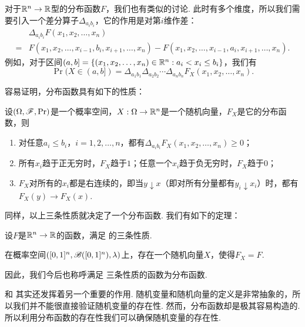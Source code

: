 对于$\mathbb{R}^n\to\mathbb{R}$型的分布函数$F$，我们也有类似的讨论. 此时有多个维度，所以我们需要引入一个差分算子$\Delta_{a_ib_i}$，它的作用是对第$i$维作差：
\begin{align*}
    &\Delta_{a_ib_i}F(x_1,x_2,\ldots,x_n) \\
    = &F(x_1,x_2,\ldots,x_{i-1},b_i,x_{i+1},\ldots,x_n)-F(x_1,x_2,\ldots,x_{i-1},a_i,x_{i+1},\ldots,x_n).
\end{align*}
例如，对于区间$(a,b]=\{(x_1,x_2,\ldots,x_n)\in\mathbb{R}^n:a_i<x_i\leq b_i\}$，我们有
\[
    \Pr(X\in(a,b]) = \Delta_{a_1b_1}\Delta_{a_2b_2}\cdots\Delta_{a_nb_n}F_X(x_1,x_2,\ldots,x_n).
\]

容易证明，分布函数具有如下的性质：

\begin{proposition}\label{prop:distribution-function-n}
设$(\Omega,\mathscr{F},\Pr)$是一个概率空间，$X:\Omega\to\mathbb{R}^n$是一个随机向量，$F_X$是它的分布函数，则
\begin{enumerate}
    \item 对任意$a_i\leq b_i$，$i=1,2,\ldots,n$，都有$\Delta_{a_ib_i}F_X(x_1,x_2,\ldots,x_n)\geq 0$；
    \item 所有$x_i$趋于正无穷时，$F_X$趋于$1$；任意一个$x_i$趋于负无穷时，$F_X$趋于$0$；
    \item $F_X$对所有的$x_i$都是右连续的，即当$y\downarrow x$（即对所有分量都有$y_i\downarrow x_i$）时，都有$F_X(y)\to F_X(x)$.
\end{enumerate}
\end{proposition}

同样，以上三条性质就决定了一个分布函数. 我们有如下的定理：

\begin{theorem}\label{thm:distribution-function-n}
设$F$是$\mathbb{R}^n\to\mathbb{R}$的函数，满足 的三条性质.

在概率空间$([0,1]^n,\mathscr{B}([0,1]^n),\lambda)$上，存在一个随机向量$X$，使得$F_X=F$.
\end{theorem}

因此，我们今后也称呼满足 三条性质的函数为分布函数. 

\begin{remark}
 和 其实还发挥着另一个重要的作用. 随机变量和随机向量的定义是非常抽象的，所以我们并不能很直接验证随机变量的存在性. 然而，分布函数却是极其容易构造的. 所以利用分布函数的存在性我们可以确保随机变量的存在性. 
\end{remark}

